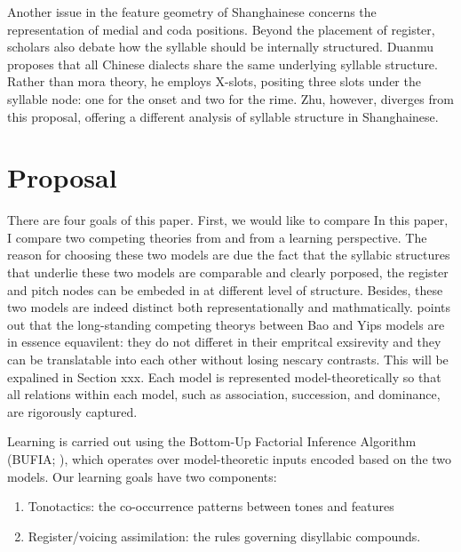 \documentclass[11pt]{article}
\begin{document}
Another issue in the feature geometry of Shanghainese concerns the 
representation of medial and coda positions. Beyond the placement of register, 
scholars also debate how the syllable should be internally structured. Duanmu 
proposes that all Chinese dialects share the same underlying syllable 
structure. Rather than mora theory, he employs X-slots, positing three slots 
under the syllable node: one for the onset and two for the rime. Zhu, however, 
diverges from this proposal, offering a different analysis of syllable 
structure in Shanghainese.

\section{Proposal}
There are four goals of this paper. First, we would like to compare
In this paper, I compare two competing theories from \citet{duanmu1988}
and \citet{zhu1999shanghai} from a learning perspective. The reason for 
choosing these two models are due the fact that the syllabic structures
that underlie these two models are comparable and clearly porposed, 
the register and pitch nodes can be embeded in at different level of
structure. Besides, these two models are indeed distinct both representationally
and mathmatically. \citet{oakdenNotationalEquivalenceTonal2020} points out
that the long-standing competing theorys between Bao and Yips models are 
in essence equavilent: they do not differet in their empritcal exsirevity 
and they can be translatable into each other without losing nescary contrasts. 
This will be expalined in Section xxx. Each model is represented model-theoretically 
so that all relations within each model, such as association, succession, and dominance, are rigorously captured.



Learning is carried out using the Bottom-Up Factorial Inference Algorithm 
(BUFIA; \citet{chandleeBufia2019}), which operates over model-theoretic inputs 
encoded based on the two models. Our learning goals have two components:

\begin{enumerate}
	\item Tonotactics: the co-occurrence patterns between tones and features\\

	\item Register/voicing assimilation: the rules governing disyllabic compounds.
	
\end{enumerate}
\end{document}
